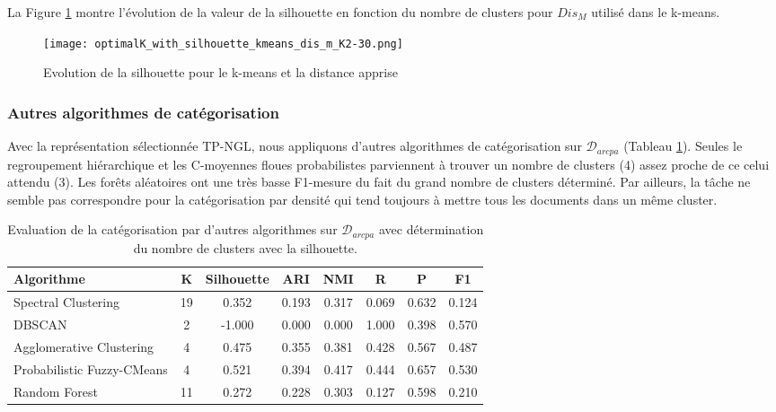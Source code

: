La Figure \ref{fig:similarite:optimalK_with_silhouette_kmeans_dis_m_K2-30} montre l'évolution de la valeur de la silhouette en fonction du nombre de clusters pour $Dis_M$ utilisé dans le k-means. 

\begin{figure}[!htb]
	\centering \texttt{[image: optimalK\_with\_silhouette\_kmeans\_dis\_m\_K2-30.png]} \hfil
	
	\caption{Evolution de la silhouette pour le k-means et la distance apprise}\label{fig:similarite:optimalK_with_silhouette_kmeans_dis_m_K2-30}
\end{figure}
 

\subsubsection{Autres algorithmes de catégorisation}
Avec la représentation sélectionnée TP-NGL, nous appliquons d'autres algorithmes de catégorisation sur $\mathcal{D}_{arcpa}$ (Tableau \ref{tab:similarite:validation-supervisee-optKbySilhouette-autres_algos}). Seules le regroupement hiérarchique et les C-moyennes floues probabilistes parviennent à trouver un nombre de clusters (4) assez proche de ce celui attendu (3). Les forêts aléatoires ont une très basse F1-mesure du fait du grand nombre de clusters déterminé. Par ailleurs, la tâche ne semble pas correspondre pour la catégorisation par densité qui tend toujours à mettre tous les documents dans un même cluster.
\begin{table}[!htb]
	\centering \scriptsize
	\begin{tabular}[pos]{|l|c|c|c|c|c|c|c|}
		\hline
		\textbf{Algorithme}& \textbf{K}& \textbf{Silhouette}& \textbf{ARI} & \textbf{NMI} & \textbf{R} & \textbf{P} & \textbf{F1} \\ \hline
		Spectral Clustering & 19 & 0.352 & 0.193 & 0.317 & 0.069 & 0.632 & 0.124 \\ \hline 
		DBSCAN & 2 & -1.000 & 0.000 & 0.000 & 1.000 & 0.398 & 0.570 \\ \hline 
		Agglomerative Clustering & 4 & 0.475 & 0.355 & 0.381 & 0.428 & 0.567 & 0.487 \\ \hline 
		Probabilistic Fuzzy-CMeans & 4 & 0.521 & 0.394 & 0.417 & 0.444 & 0.657 & 0.530 \\ \hline 
		Random Forest & 11 & 0.272 & 0.228 & 0.303 & 0.127 & 0.598 & 0.210 \\ \hline 
	\end{tabular}
	\caption{Evaluation de la catégorisation par d'autres algorithmes sur $\mathcal{D}_{arcpa}$ avec détermination du nombre de clusters avec la silhouette.} \label{tab:similarite:validation-supervisee-optKbySilhouette-autres_algos}
\end{table}

